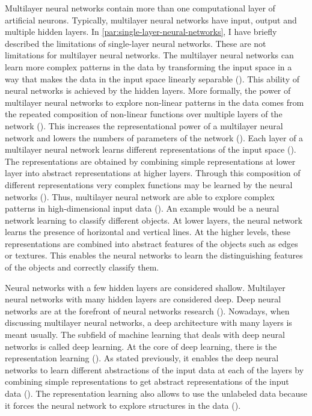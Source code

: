 \documentclass{BachelorBUI}
\begin{document}
                Multilayer neural networks contain more than one computational layer of artificial neurons. Typically, multilayer neural networks have input, output and multiple hidden layers. In \autoref{par:single-layer-neural-networks}, I have briefly described the limitations of single-layer neural networks. These are not limitations for multilayer neural networks. The multilayer neural networks can learn more complex patterns in the data by transforming the input space in a way that makes the data in the input space linearly separable (\cite{LeCun:2015}). This ability of neural networks is achieved by the hidden layers. More formally, the power of multilayer neural networks to explore non-linear patterns in the data comes from the repeated composition of non-linear functions over multiple layers of the network (\cite{Aggarwal:2018}). This increases the representational power of a multilayer neural network and lowers the numbers of parameters of the network (\cite{Aggarwal:2018}). Each layer of a multilayer neural network learns different representations of the input space (\cite{LeCun:2015}). The representations are obtained by combining simple representations at lower layer into abstract representations at higher layers. Through this composition of different representations very complex functions may be learned by the neural networks (\cite{Bishop:2024}). Thus, multilayer neural network are able to explore complex patterns in high-dimensional input data (\cite{LeCun:2015}). An example would be a neural network learning to classify different objects. At lower layers, the neural network learns the presence of horizontal and vertical lines. At the higher levels, these representations are combined into abstract features of the objects such as edges or textures. This enables the neural networks to learn the distinguishing features of the objects and correctly classify them.

                Neural networks with a few hidden layers are considered shallow. Multilayer neural networks with many hidden layers are considered deep. Deep neural networks are at the forefront of neural networks research (\cite{LeCun:2015}). Nowadays, when discussing multilayer neural networks, a deep architecture with many layers is meant usually. The subfield of machine learning that deals with deep neural networks is called deep learning. At the core of deep learning, there is the representation learning (\cite{LeCun:2015}). As stated previously, it enables the deep neural networks to learn different abstractions of the input data at each of the layers by combining simple representations to get abstract representations of the input data (\cite{LeCun:2015}). The representation learning also allows to use the unlabeled data because it forces the neural network to explore structures in the data (\cite{Bishop:2024}).
\end{document}

